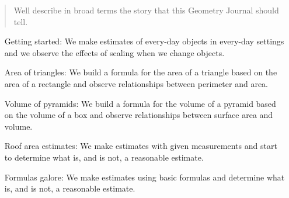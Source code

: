 \documentclass{ximera}
\author{Bart Snapp}
\begin{document}
\begin{abstract}
  Well describe in broad terms the story that this Geometry Journal
  should tell.
\end{abstract}
\maketitle


\begin{enumerate}
  \item[Getting started:] We make estimates of every-day objects in
    every-day settings and we observe the effects of scaling when we
    change objects.
  \item[Area of triangles:] We build a formula for the area of a
    triangle based on the area of a rectangle and observe
    relationships between perimeter and area.
  \item[Volume of pyramids:] We build a formula for the volume of a
    pyramid based on the volume of a box and observe relationships
    between surface area and volume.
  \item[Roof area estimates:] We make estimates with given measurements
    and start to determine what is, and is not, a reasonable estimate.
  \item[Formulas galore:] We make estimates using basic formulas and
    determine what is, and is not, a reasonable estimate.
\end{enumerate}
\end{document}
